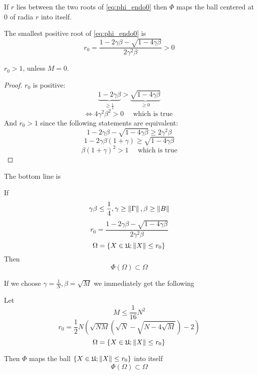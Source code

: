 \documentclass{article}
\begin{document}
\begin{lemma}
    If \( r \) lies between the two roots of \eqref{eq:phi_endo0}
    then \( \Phi \) maps the ball centered at \( 0 \) of radia \( r \) into itself.

    The smallest positive root of \eqref{eq:phi_endo0} is
    \begin{equation}\label{eq:endo_r0}
        r_0 = \frac{1 - 2\gamma\beta - \sqrt{1-4\gamma\beta}}{2 \gamma^2 \beta} > 0
    \end{equation}

    \( r_0>1 \), unless \( M=0 \).
\end{lemma}
\begin{proof}
    \( r_0 \) is positive:
    \[\underbrace{1-2\gamma\beta}_{\geq\frac12} > \underbrace{\sqrt{1-4\gamma\beta}}_{\geq0}\]
    \[\iff 4\gamma^2\beta^2 > 0 \quad\text{ which is true }\]
    And \( r_0>1 \) since the following statements are equivalent:
    \[1 - 2\gamma\beta - \sqrt{1-4\gamma\beta} \geq 2 \gamma^2 \beta\]
    \[1 - 2\gamma\beta(1 +  \gamma) \geq \sqrt{1-4\gamma\beta}\]
    \[\beta(1+\gamma)^2>1 \quad\text{ which is true}\]
\end{proof}

The bottom line is
\begin{lemma}\label{thm:endo}
    If
    \[\gamma\beta\leq\frac14, \gamma\geq\left\|{\Gamma}\right\|, \beta\geq\left\|{B}\right\|\]
    \[r_0 = \frac{1 - 2\gamma\beta - \sqrt{1-4\gamma\beta}}{2 \gamma^2 \beta}\]
    \[\Omega = \{ X\in\mathfrak U; \left\|{X}\right\| \leq r_0 \}\]
    Then
    \[\Phi(\Omega)\subset\Omega\]
\end{lemma}

If we choose \( \gamma=\frac{1}{N}, \beta=\sqrt{M} \) we immediately get the following
\begin{thm}\label{thm:endo_nm}
    Let
    \begin{equation}\label{eq:phi_endo_nm_condition}
        M \leq \frac{1}{16} N^2
    \end{equation}
    \begin{equation}\label{eq:phi_endo_nm_radia}
        r_0 = \frac12 N
        \left(
        \sqrt{NM}(\sqrt{N} - \sqrt{N-4\sqrt{M}}) - 2
        \right)
    \end{equation}
    \[\Omega = \{ X\in\mathfrak U; \left\|{X}\right\| \leq r_0 \}\]

    Then
    \( \Phi \) maps the ball \( \{ X\in\mathfrak U; \left\|{X}\right\| \leq r_0 \} \) into itself
    \[\Phi(\Omega)\subset\Omega\]
\end{thm}
\end{document}
